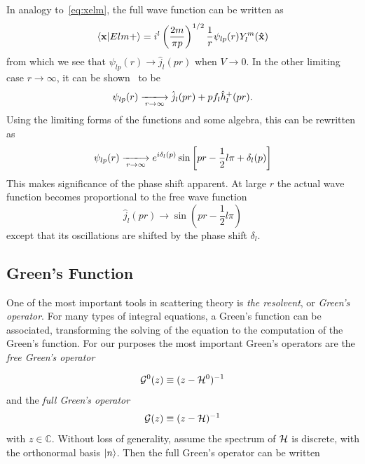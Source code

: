 In analogy to~\eqref{eq:xelm}, the full wave function can be written as
\begin{equation*}
  \ip{\vb{x}}{Elm+} = i^{l}\left( \frac{2m}{\pi p} \right)^{1/2}\frac{1}{r}\psi_{lp}(r)Y^{m}_{l}(\vu{x})
\end{equation*}
from which we see that \(\psi_{lp}(r)\to\hat{j}_{l}(pr)\) when \(V\to 0\). In
the other limiting case \(r\to \infty\), it can be shown~\cite[p.~187]{taylor} to be
\begin{equation*}
  \psi_{lp}(r)   \xlongrightarrow[r\to \infty]{} \hat{j}_{l}(pr)+pf_{l}\hat{h}^{+}_{l}(pr).
\end{equation*}
Using the limiting forms of the functions and some algebra, this can be
rewritten as
\begin{equation*}
  \psi_{lp}(r)   \xlongrightarrow[r\to \infty]{} e^{i\delta_{l}(p)}\sin\left[ pr - \frac{1}{2}l\pi+\delta_{l}(p) \right]
\end{equation*}
This makes significance of the phase shift apparent. At large \(r\) the actual
wave function becomes proportional to the free wave function
\begin{equation*}
  \hat{j}_{l}(pr)\to\sin\left( pr-\frac{1}{2}l\pi \right)
\end{equation*}
except that its oscillations are shifted by the phase shift \(\delta_{l}\).


\subsection{Green's Function}
One of the most important tools in scattering theory is \textit{the resolvent},
or \textit{Green's operator}. For many types of integral equations, a Green's
function can be associated, transforming the solving of the equation to the
computation of the Green's function. For our purposes the most important Green's
operators are the \textit{free Green's operator}

\begin{equation*}
  \mathcal{G}^{0}(z) \equiv (z-\mathcal{H}^{0})^{-1}
\end{equation*}
and the \textit{full Green's operator}
\begin{equation*}
  \mathcal{G}(z) \equiv (z-\mathcal{H})^{-1}
\end{equation*}
with \(z\in\mathbb{C}\). Without loss of generality, assume the spectrum of
\(\mathcal{H}\) is discrete, with the orthonormal basis \({\ket{n}}\). Then the full
Green's operator can be written

